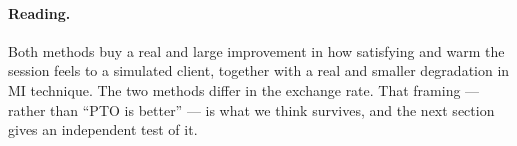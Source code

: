 \paragraph{Reading.}
Both methods buy a real and large improvement in how satisfying and warm the session feels
to a simulated client, together with a real and smaller degradation in MI technique. The
two methods differ in the exchange rate. That framing --- rather than ``PTO is better'' ---
is what we think survives, and the next section gives an independent test of it.
